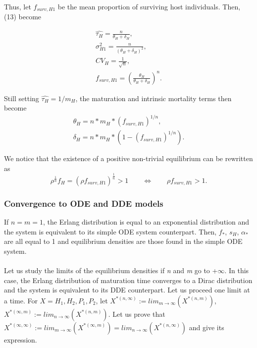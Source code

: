 \documentclass[12pt,a4paper,onecolumn]{article}
\begin{document}
Thus, let $f_{surv,H1}$ be the mean proportion of surviving host individuals. Then, (13) become 

\begin{align}
\hat{\tau_{H}} = \frac{n}{\theta_{H} + \delta_{H}}, \nonumber \\
\sigma^2_{H1} = \frac{n}{(\theta_{H} + \delta_{H})^2}, \\
CV_{H} = \frac{1}{\sqrt{n}}, \\
f_{surv,H1} = (\frac{\theta_{H}}{\theta_{H} + \delta_{H}})^n.
\end{align}

Still setting $\hat{\tau_{H}} = 1/m_H$, the maturation and intrinsic mortality terms then become 
\begin{equation}
\begin{alignedat}{2}
\theta_{H} = n * m_{H}* (f_{surv,H1})^{1/n}, \\
\delta_{H} = n* m_{H}* (1-(f_{surv,H1})^{1/n}).
\end{alignedat}
\end{equation}

We notice that the existence of a positive non-trivial equilibrium can be rewritten as 
$$\rho^{\frac{1}{n}}f_H = (\rho f_{surv,H1})^{\frac{1}{n}} > 1 \qquad \iff \qquad \rho f_{surv,H1} > 1.$$

\subsubsection{Convergence to ODE and DDE models}
If $n = m = 1$, the Erlang distribution is equal to an exponential distribution and the system is equivalent to its simple ODE system counterpart. Then, $f_*$, $s_H$, $\alpha_*$ are all equal to 1 and equilibrium densities are those found in the simple ODE system. \\ \\

Let us study the limits of the equilibrium densities if \textit{n} and \textit{m} go to +$\infty$. In this case, the Erlang distribution of maturation time converges to a Dirac distribution and the system is equivalent to its DDE counterpart. Let us proceed one limit at a time. For $X = H_1, H_2, P_1, P_2$, let $X^{*(n, \infty)} := lim_{m\to\infty}(X^{*(n,m)})$,  $X^{*(\infty,m)} := lim_{n\to\infty}(X^{*(n,m)})$. Let us prove that $X^{*(\infty, \infty)} := lim_{m\to\infty} (X^{*(\infty, m)}) = lim_{n\to\infty}(X^{*(n,\infty)})$ and give its expression. \\
\end{document}
